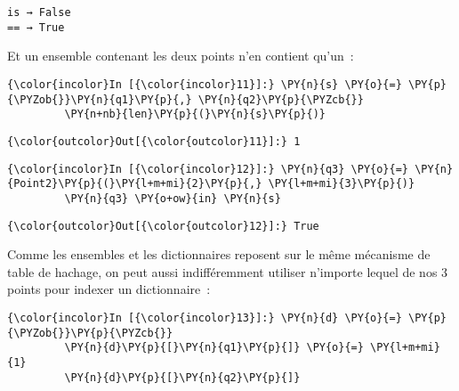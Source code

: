     \begin{Verbatim}[commandchars=\\\{\},frame=single,framerule=0.3mm,rulecolor=\color{cellframecolor}]
is → False 
== → True
\end{Verbatim}

    Et un ensemble contenant les deux points n'en contient qu'un~:

    \begin{Verbatim}[commandchars=\\\{\},frame=single,framerule=0.3mm,rulecolor=\color{cellframecolor}]
{\color{incolor}In [{\color{incolor}11}]:} \PY{n}{s} \PY{o}{=} \PY{p}{\PYZob{}}\PY{n}{q1}\PY{p}{,} \PY{n}{q2}\PY{p}{\PYZcb{}}
         \PY{n+nb}{len}\PY{p}{(}\PY{n}{s}\PY{p}{)}
\end{Verbatim}


\begin{Verbatim}[commandchars=\\\{\},frame=single,framerule=0.3mm,rulecolor=\color{cellframecolor}]
{\color{outcolor}Out[{\color{outcolor}11}]:} 1
\end{Verbatim}
            
    \begin{Verbatim}[commandchars=\\\{\},frame=single,framerule=0.3mm,rulecolor=\color{cellframecolor}]
{\color{incolor}In [{\color{incolor}12}]:} \PY{n}{q3} \PY{o}{=} \PY{n}{Point2}\PY{p}{(}\PY{l+m+mi}{2}\PY{p}{,} \PY{l+m+mi}{3}\PY{p}{)}
         \PY{n}{q3} \PY{o+ow}{in} \PY{n}{s}
\end{Verbatim}


\begin{Verbatim}[commandchars=\\\{\},frame=single,framerule=0.3mm,rulecolor=\color{cellframecolor}]
{\color{outcolor}Out[{\color{outcolor}12}]:} True
\end{Verbatim}
            
    Comme les ensembles et les dictionnaires reposent sur le même mécanisme
de table de hachage, on peut aussi indifféremment utiliser n'importe
lequel de nos 3 points pour indexer un dictionnaire~:

    \begin{Verbatim}[commandchars=\\\{\},frame=single,framerule=0.3mm,rulecolor=\color{cellframecolor}]
{\color{incolor}In [{\color{incolor}13}]:} \PY{n}{d} \PY{o}{=} \PY{p}{\PYZob{}}\PY{p}{\PYZcb{}}
         \PY{n}{d}\PY{p}{[}\PY{n}{q1}\PY{p}{]} \PY{o}{=} \PY{l+m+mi}{1}
         \PY{n}{d}\PY{p}{[}\PY{n}{q2}\PY{p}{]}
\end{Verbatim}


